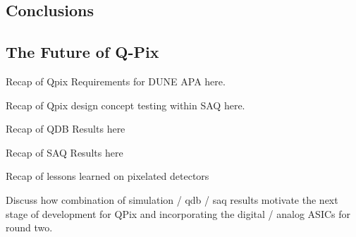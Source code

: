 \subsection{Conclusions}

\subsection{The Future of Q-Pix}

Recap of Qpix Requirements for DUNE APA here.

Recap of Qpix design concept testing within SAQ here.

Recap of QDB Results here

Recap of SAQ Results here

Recap of lessons learned on pixelated detectors

Discuss how combination of simulation / qdb / saq results motivate the next stage of development for QPix and incorporating the digital / analog ASICs for round two.
